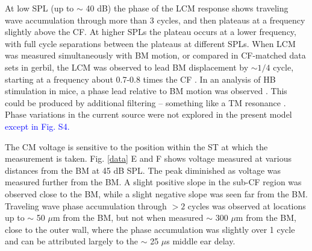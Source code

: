 \documentclass{biophys-new}
\begin{document}
\par{At low SPL (up to $\sim$ 40 dB) the phase of the LCM response shows traveling wave accumulation through more than 3 cycles, and then plateaus at a frequency slightly above the CF.  At higher SPLs the plateau occurs at a lower frequency, with full cycle separations between the plateaus at different SPLs.  When LCM was measured simultaneously with BM motion, or compared in CF-matched data sets in gerbil, the LCM was observed to lead BM displacement by $\sim 1/4$ cycle, starting at a frequency about 0.7-0.8 times the CF \cite{dongolson,fallah, nankaliwang}. In an analysis of HB stimulation in mice, a phase lead relative to BM motion was observed \cite{lee}. This could be produced by additional filtering -- something like a TM resonance \cite{nankaliwang}. Phase variations in the current source were not explored in the present model \textcolor{blue}{except in Fig. S4.}}  
\par{The CM voltage is sensitive to the position within the ST at which the measurement is taken. Fig. \ref{data} E and F shows voltage measured at various distances from the BM at 45 dB SPL. The peak diminished as voltage was measured further from the BM. A slight positive slope in the sub-CF region was observed close to the BM, while a slight negative slope was seen far from the BM. Traveling wave phase accumulation through $> 2$ cycles was observed at locations up to $\sim$ 50 $\mu$m from the BM, but not when measured $\sim$ 300 $\mu$m from the BM, close to the outer wall, where the phase accumulation was slightly over 1 cycle and can be attributed largely to the $\sim$ 25 $\mu$s middle ear delay. }
\end{document}
